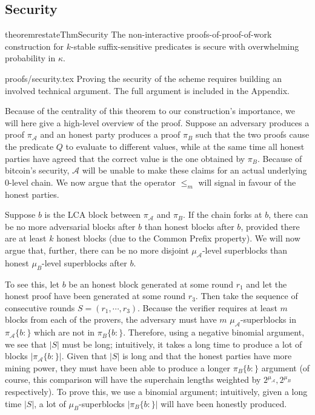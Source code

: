 \subsection{Security}

\begin{restatable}{theorem}{restateThmSecurity}
    \label{thm.security}
    The non-interactive proofs-of-proof-of-work construction for $k$-stable
    suffix-sensitive predicates is secure with overwhelming probability in
    $\kappa$.
\end{restatable}

\ifonecolumn
{proofs/security.tex}
\else
Proving the security of the scheme requires building an involved technical
argument. The full argument is included in the Appendix.

Because of the centrality of this theorem to our construction's importance, we
will here give a high-level overview of the proof. Suppose an adversary produces
a proof $\pi_\mathcal{A}$ and an honest party produces a proof $\pi_B$ such that
the two proofs cause the predicate $Q$ to evaluate to different values, while at
the same time all honest parties have agreed that the correct value is the one
obtained by $\pi_B$. Because of bitcoin's security, $\mathcal{A}$ will be unable
to make these claims for an actual underlying 0-level chain. We now argue that
the operator $\leq_m$ will signal in favour of the honest parties.

Suppose $b$ is the LCA block between $\pi_\mathcal{A}$ and $\pi_B$. If the chain
forks at $b$, there can be no more adversarial blocks after $b$ than honest
blocks after $b$, provided there are at least $k$ honest blocks (due to the
Common Prefix property). We will now argue that, further, there can be no more
disjoint $\mu_\mathcal{A}$-level superblocks than honest $\mu_B$-level
superblocks after $b$.

To see this, let $b$ be an honest block generated at some round $r_1$ and let
the honest proof have been generated at some round $r_3$. Then take the sequence
of consecutive rounds $S = (r_1, \cdots, r_3)$. Because the verifier requires at
least $m$ blocks from each of the provers, the adversary must have $m$
$\mu_\mathcal{A}$-superblocks in $\pi_\mathcal{A}\{b:\}$ which are not in
$\pi_B\{b:\}$. Therefore, using a negative binomial argument, we see that $|S|$
must be long; intuitively, it takes a long time to produce a lot of blocks
$|\pi_\mathcal{A}\{b:\}|$. Given that $|S|$ is long and that the honest parties
have more mining power, they must have been able to produce a longer
$\pi_B\{b:\}$ argument (of course, this comparison will have the superchain
lengths weighted by $2^{\mu_\mathcal{A}}, 2^{\mu_B}$ respectively). To prove
this, we use a binomial argument; intuitively, given a long time $|S|$, a lot of
$\mu_B$-superblocks $|\pi_B\{b:\}|$ will have been honestly produced.

